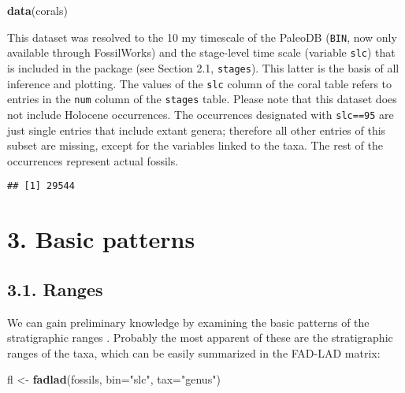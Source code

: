 \documentclass[]{article}
\newenvironment{Shaded}{\begin{snugshade}}{\end{snugshade}}
\newcommand{\KeywordTok}[1]{\textcolor[rgb]{0.13,0.29,0.53}{\textbf{{#1}}}}
\newcommand{\DataTypeTok}[1]{\textcolor[rgb]{0.13,0.29,0.53}{{#1}}}
\newcommand{\DecValTok}[1]{\textcolor[rgb]{0.00,0.00,0.81}{{#1}}}
\newcommand{\StringTok}[1]{\textcolor[rgb]{0.31,0.60,0.02}{{#1}}}
\newcommand{\CommentTok}[1]{\textcolor[rgb]{0.56,0.35,0.01}{\textit{{#1}}}}
\newcommand{\NormalTok}[1]{{#1}}
\begin{document}
\begin{Shaded}
\begin{Highlighting}[]
\KeywordTok{data}\NormalTok{(corals)}
\end{Highlighting}
\end{Shaded}

This dataset was resolved to the 10 my timescale of the PaleoDB
(\texttt{BIN}, now only available through FossilWorks) and the
stage-level time scale (variable \texttt{slc}) that is included in the
package (see Section 2.1, \texttt{stages}). This latter is the basis of
all inference and plotting. The values of the \texttt{slc} column of the
coral table refers to entries in the \texttt{num} column of the
\texttt{stages} table. Please note that this dataset does not include
Holocene occurrences. The occurrences designated with \texttt{slc==95}
are just single entries that include extant genera; therefore all other
entries of this subset are missing, except for the variables linked to
the taxa. The rest of the occurrences represent actual fossils.

\begin{Shaded}
\end{Shaded}

\begin{verbatim}
## [1] 29544
\end{verbatim}

\section{3. Basic patterns}\label{basic-patterns}

\subsection{3.1. Ranges}\label{ranges}

We can gain preliminary knowledge by examining the basic patterns of the
stratigraphic ranges . Probably the most apparent of these are the
stratigraphic ranges of the taxa, which can be easily summarized in the
FAD-LAD matrix:

\begin{Shaded}
\begin{Highlighting}[]
\NormalTok{fl <-}\StringTok{ }\KeywordTok{fadlad}\NormalTok{(fossils, }\DataTypeTok{bin=}\StringTok{"slc"}\NormalTok{, }\DataTypeTok{tax=}\StringTok{"genus"}\NormalTok{)}
\end{Highlighting}
\end{Shaded}
\end{document}
